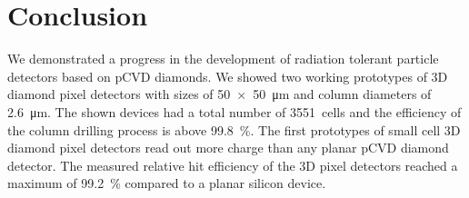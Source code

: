 \section{Conclusion}
We demonstrated a progress in the development of radiation tolerant particle detectors based on \ac{pCVD} diamonds. We showed two working prototypes of 3D diamond pixel detectors with sizes of \SI{50x50}{\um} and column diameters of \SI{2.6}{\um}. The shown devices had a total number of \SI{3551}{cells} and the efficiency of the column drilling process is above \SI{99.8}{\%}. The first prototypes of small cell 3D diamond pixel detectors read out more charge than any planar \ac{pCVD} diamond detector. The measured relative hit efficiency of the 3D pixel detectors reached a maximum of \SI{99.2}{\%} compared to a planar silicon device.\par